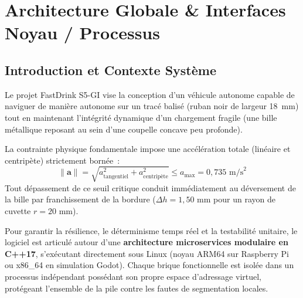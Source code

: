 \chapter{Architecture Globale \& Interfaces Noyau / Processus}
\label{chap:architecture}

\section{Introduction et Contexte Système}
Le projet FastDrink S5-GI vise la conception d'un véhicule autonome capable de naviguer de manière autonome sur un tracé balisé (ruban noir de largeur 18~mm) tout en maintenant l'intégrité dynamique d'un chargement fragile (une bille métallique reposant au sein d'une coupelle concave peu profonde). 

La contrainte physique fondamentale impose une accélération totale (linéaire et centripète) strictement bornée~:
\begin{equation}
    \|\mathbf{a}\| = \sqrt{a_{\text{tangentiel}}^2 + a_{\text{centripète}}^2} \le a_{\max} = 0{,}735\text{ m/s}^2
\end{equation}
Tout dépassement de ce seuil critique conduit immédiatement au déversement de la bille par franchissement de la bordure ($\Delta h = 1{,}50\text{ mm}$ pour un rayon de cuvette $r = 20\text{ mm}$).

Pour garantir la résilience, le déterminisme temps réel et la testabilité unitaire, le logiciel est articulé autour d'une \textbf{architecture microservices modulaire en C++17}, s'exécutant directement sous Linux (noyau ARM64 sur Raspberry Pi ou x86\_64 en simulation Godot). Chaque brique fonctionnelle est isolée dans un processus indépendant possédant son propre espace d'adressage virtuel, protégeant l'ensemble de la pile contre les fautes de segmentation locales.

